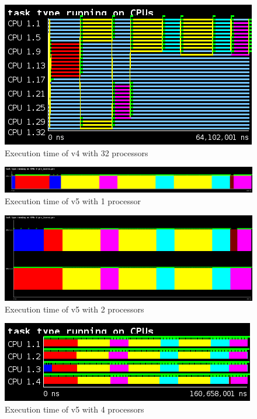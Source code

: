 \begin{figure}[H]%
    \caption{Execution time of v4 with 32 processors}%
    \label{fig:plot_v4_32}
    \centering
    \includegraphics[width=\textwidth]{./data/3dfft_/plots/v4_32.png}
\end{figure}

\begin{figure}[H]%
    \caption{Execution time of v5 with 1 processor}%
    \label{fig:plot_v5_01}
    \centering
    \includegraphics[width=\textwidth]{./data/3dfft_/plots/v5_01.png}
\end{figure}

\begin{figure}[H]%
    \caption{Execution time of v5 with 2 processors}%
    \label{fig:plot_v5_02}
    \centering
    \includegraphics[width=\textwidth]{./data/3dfft_/plots/v5_02.png}
\end{figure}

\begin{figure}[H]%
    \caption{Execution time of v5 with 4 processors}%
    \label{fig:plot_v5_04}
    \centering
    \includegraphics[width=\textwidth]{./data/3dfft_/plots/v5_04.png}
\end{figure}

